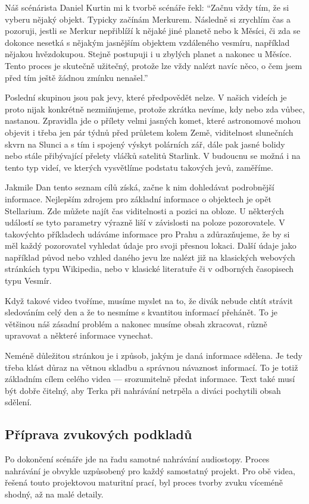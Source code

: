 \documentclass[12pt,a4paper,titlepage]{article}
\begin{document}
Náš scénárista Daniel Kurtin mi k tvorbě scénáře řekl: \enquote{Začnu vždy tím, že si vyberu nějaký objekt. Typicky začínám Merkurem. Následně si zrychlím čas a pozoruji, jestli se Merkur nepřiblíží k nějaké jiné planetě nebo k Měsíci, či zda se dokonce nesetká s nějakým jasnějším objektem vzdáleného vesmíru, například nějakou hvězdokupou. Stejně postupuji i u zbylých planet a nakonec u Měsíce. Tento proces je skutečně užitečný, protože lze vždy nalézt navíc něco, o čem jsem před tím ještě žádnou zmínku nenašel.}

Poslední skupinou jsou pak jevy, které předpovědět nelze. V našich videích je proto nijak konkrétně nezmiňujeme, protože zkrátka nevíme, kdy nebo zda vůbec, nastanou. Zpravidla jde o přílety velmi jasných komet, které astronomové mohou objevit i třeba jen pár týdnů před průletem kolem Země,  viditelnost slunečních skvrn na Slunci a s tím i spojený výskyt polárních zář, dále pak jasné bolidy nebo stále přibývající přelety vláčků satelitů Starlink. V budoucnu se možná i na tento typ videí, ve kterých vysvětlíme podstatu takových jevů, zaměříme. 

Jakmile Dan tento seznam cílů získá, začne k nim dohledávat podrobnější informace. Nejlepším zdrojem pro základní informace o objektech je opět Stellarium. Zde můžete najít čas viditelnosti a pozici na obloze. U některých událostí se tyto parametry výrazně liší v závislosti na poloze pozorovatele. V takovýchto příkladech udáváme informace pro Prahu a zdůrazňujeme, že by si měl každý pozorovatel vyhledat údaje pro svoji přesnou lokaci. Další údaje jako například původ nebo vzhled daného jevu lze nalézt již na klasických webových stránkách typu Wikipedia, nebo v klasické literatuře či v odborných časopisech typu Vesmír.

Když takové video tvoříme, musíme myslet na to, že divák nebude chtít strávit sledováním celý den a že to nesmíme s kvantitou informací přehánět. To je většinou náš zásadní problém a nakonec musíme obsah zkracovat, různě upravovat a některé informace vynechat. 

Neméně důležitou stránkou je i způsob, jakým je daná informace sdělena. Je tedy třeba klást důraz na větnou skladbu a správnou návaznost informací. To je totiž základním cílem celého videa --- srozumitelně předat informace. Text také musí být dobře čitelný, aby Terka při nahrávání netrpěla a diváci pochytili obsah sdělení.

\subsection{Příprava zvukových podkladů}\label{makingof:audio-prep}
Po dokončení scénáře jde na řadu samotné nahrávání audiostopy. Proces nahrávání je obvykle uzpůsobený pro každý samostatný projekt. Pro obě videa, řešená touto projektovou maturitní prací, byl proces tvorby zvuku víceméně shodný, až na malé detaily. 
\end{document}
